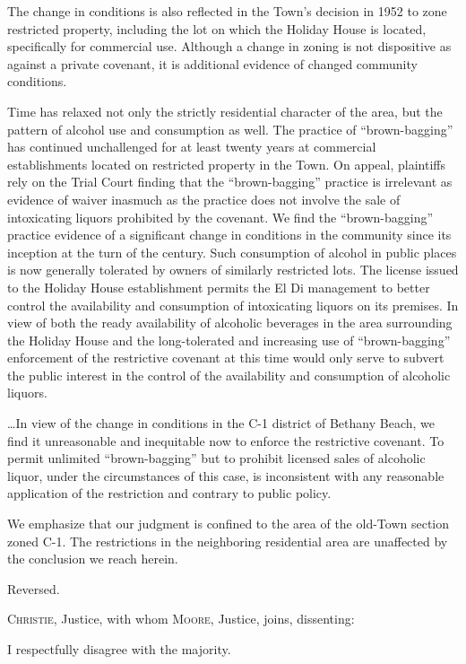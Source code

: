 The change in conditions is also reflected in the Town's decision in 1952 to
zone restricted property, including the lot on which the Holiday House is
located, specifically for commercial use. Although a change in zoning is not
dispositive as against a private covenant, it is additional evidence of changed
community conditions. 

Time has relaxed not only the strictly residential character of the area, but
the pattern of alcohol use and consumption as well. The practice of
``brown-bagging'' has continued unchallenged for at least twenty years at
commercial establishments located on restricted property in the Town. On appeal,
plaintiffs rely on the Trial Court finding that the ``brown-bagging'' practice
is irrelevant as evidence of waiver inasmuch as the practice does not involve
the sale of intoxicating liquors prohibited by the covenant. We find the
``brown-bagging'' practice evidence of a significant change in conditions in the
community since its inception at the turn of the century. Such consumption of
alcohol in public places is now generally tolerated by owners of similarly
restricted lots. The license issued to the Holiday House establishment permits
the El Di management to better control the availability and consumption of
intoxicating liquors on its premises. In view of both the ready availability of
alcoholic beverages in the area surrounding the Holiday House and the
long-tolerated and increasing use of ``brown-bagging'' enforcement of the
restrictive covenant at this time would only serve to subvert the public
interest in the control of the availability and consumption of alcoholic
liquors.

\ldots In view of the change in conditions in the C-1 district of Bethany Beach,
we find it unreasonable and inequitable now to enforce the restrictive covenant.
To permit unlimited ``brown-bagging'' but to prohibit licensed sales of
alcoholic liquor, under the circumstances of this case, is inconsistent with any
reasonable application of the restriction and contrary to public policy.

We emphasize that our judgment is confined to the area of the old-Town section
zoned C-1. The restrictions in the neighboring residential area are unaffected
by the conclusion we reach herein.

Reversed.

\opinion \textsc{Christie}, Justice, with whom \textsc{Moore}, Justice, joins,
dissenting:

I respectfully disagree with the majority.

